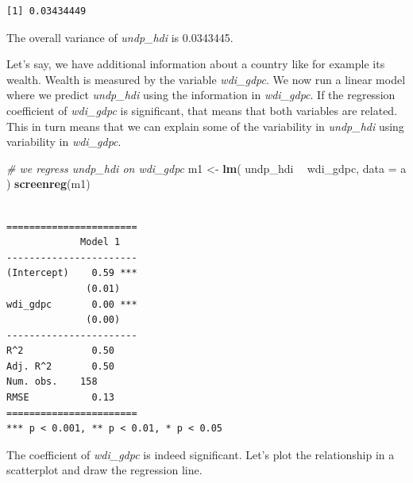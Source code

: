 \documentclass[]{article}
\newenvironment{Shaded}{\begin{snugshade}}{\end{snugshade}}
\newcommand{\KeywordTok}[1]{\textcolor[rgb]{0.13,0.29,0.53}{\textbf{#1}}}
\newcommand{\DataTypeTok}[1]{\textcolor[rgb]{0.13,0.29,0.53}{#1}}
\newcommand{\DecValTok}[1]{\textcolor[rgb]{0.00,0.00,0.81}{#1}}
\newcommand{\StringTok}[1]{\textcolor[rgb]{0.31,0.60,0.02}{#1}}
\newcommand{\CommentTok}[1]{\textcolor[rgb]{0.56,0.35,0.01}{\textit{#1}}}
\newcommand{\OperatorTok}[1]{\textcolor[rgb]{0.81,0.36,0.00}{\textbf{#1}}}
\newcommand{\NormalTok}[1]{#1}
\theoremstyle{definition}
\theoremstyle{definition}
\theoremstyle{definition}
\theoremstyle{remark}
\begin{document}
\begin{verbatim}
[1] 0.03434449
\end{verbatim}

The overall variance of \emph{undp\_hdi} is 0.0343445.

Let's say, we have additional information about a country like for
example its wealth. Wealth is measured by the variable \emph{wdi\_gdpc}.
We now run a linear model where we predict \emph{undp\_hdi} using the
information in \emph{wdi\_gdpc}. If the regression coefficient of
\emph{wdi\_gdpc} is significant, that means that both variables are
related. This in turn means that we can explain some of the variability
in \emph{undp\_hdi} using variability in \emph{wdi\_gdpc}.

\begin{Shaded}
\begin{Highlighting}[]
\CommentTok{# we regress undp_hdi on wdi_gdpc}
\NormalTok{m1 <-}\StringTok{ }\KeywordTok{lm}\NormalTok{( undp_hdi }\OperatorTok{~}\StringTok{ }\NormalTok{wdi_gdpc, }\DataTypeTok{data =}\NormalTok{ a )}
\KeywordTok{screenreg}\NormalTok{(m1)}
\end{Highlighting}
\end{Shaded}

\begin{verbatim}

=======================
             Model 1   
-----------------------
(Intercept)    0.59 ***
              (0.01)   
wdi_gdpc       0.00 ***
              (0.00)   
-----------------------
R^2            0.50    
Adj. R^2       0.50    
Num. obs.    158       
RMSE           0.13    
=======================
*** p < 0.001, ** p < 0.01, * p < 0.05
\end{verbatim}

The coefficient of \emph{wdi\_gdpc} is indeed significant. Let's plot
the relationship in a scatterplot and draw the regression line.

\begin{Shaded}
\end{Shaded}
\end{document}
